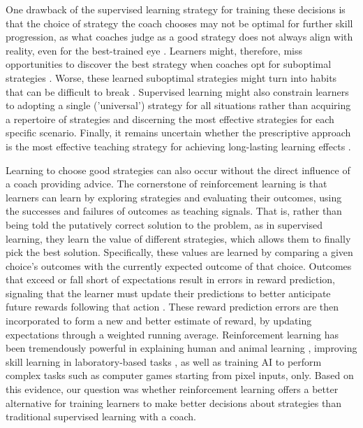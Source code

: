 \documentclass[pdflatex,sn-mathphys-num]{sn-jnl}%
\theoremstyle{thmstyleone}%
\theoremstyle{thmstyletwo}%
\theoremstyle{thmstylethree}%
\begin{document}
One drawback of the supervised learning strategy for training these decisions is that the choice of strategy the coach chooses may not be optimal for further skill progression, as what coaches judge as a good strategy does not always align with reality, even for the best-trained eye \cite{supej_impact_2019, cochrum_visual_2021}. Learners might, therefore, miss opportunities to discover the best strategy when coaches opt for suboptimal strategies \cite{gray_plateaus_2017}. Worse, these learned suboptimal strategies might turn into habits that can be difficult to break \cite{popp_effect_2020}. Supervised learning might also constrain learners to adopting a single ('universal') strategy for all situations rather than acquiring a repertoire of strategies and discerning the most effective strategies for each specific scenario. Finally, it remains uncertain whether the prescriptive approach is the most effective teaching strategy for achieving long-lasting learning effects \cite{wulf_instructions_1997, hodges_role_1999, williams_practice_2005,williams_effective_2023}.

Learning to choose good strategies can also occur without the direct influence of a coach providing advice. The cornerstone of reinforcement learning \cite{sutton_reinforcement_2018} is that learners can learn by exploring strategies and evaluating their outcomes, using the successes and failures of outcomes as teaching signals. That is, rather than being told the putatively correct solution to the problem, as in supervised learning, they learn the value of different strategies, which allows them to finally pick the best solution. Specifically, these values are learned by comparing a given choice's outcomes with the currently expected outcome of that choice. Outcomes that exceed or fall short of expectations result in errors in reward prediction, signaling that the learner must update their predictions to better anticipate future rewards following that action \cite{rescorla_theory_1972}. These reward prediction errors are then incorporated to form a new and better estimate of reward, by updating expectations through a weighted running average. Reinforcement learning has been tremendously powerful in explaining human and animal learning \cite{waelti_dopamine_2001, schultz_neural_1997, pessiglione_dopamine-dependent_2006}, improving skill learning in laboratory-based tasks \cite{lior_shmuelof_overcoming_2012, abe_reward_2011, truong_error-based_2023, hasson_reinforcement_2015}, as well as training AI to perform complex tasks such as computer games starting from pixel inputs, only\cite{mnih_human-level_2015}. Based on this evidence, our question was whether reinforcement learning offers a better alternative for training learners to make better decisions about strategies than traditional supervised learning with a coach. 
\end{document}

